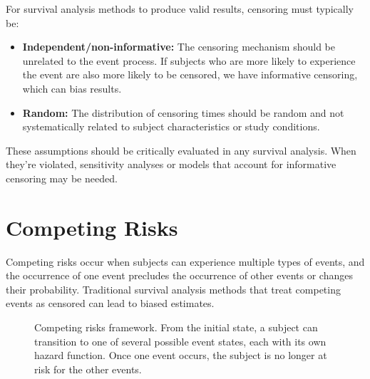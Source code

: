 For survival analysis methods to produce valid results, censoring must typically be:

\begin{itemize}
    \item \textbf{Independent/non-informative:} The censoring mechanism should be unrelated to the event process. If subjects who are more likely to experience the event are also more likely to be censored, we have informative censoring, which can bias results.

    \item \textbf{Random:} The distribution of censoring times should be random and not systematically related to subject characteristics or study conditions.
\end{itemize}

These assumptions should be critically evaluated in any survival analysis. When they're violated, sensitivity analyses or models that account for informative censoring may be needed.

\section{Competing Risks}
\label{sec:competing-risks}

Competing risks occur when subjects can experience multiple types of events, and the occurrence of one event precludes the occurrence of other events or changes their probability. Traditional survival analysis methods that treat competing events as censored can lead to biased estimates.

\begin{figure}[htbp]
    \centering
    \caption{Competing risks framework. From the initial state, a subject can transition to one of several possible event states, each with its own hazard function. Once one event occurs, the subject is no longer at risk for the other events.}
    \label{fig:competing-risks}
\end{figure}

